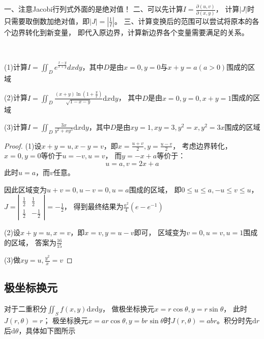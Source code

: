 \begin{note}
  一、注意Jacobi行列式外面的是绝对值！
  二、可以先计算$I = \frac{\partial(u,v)}{\partial (x,y)}$，
  计算$|J|$时只需要取倒数加绝对值，即$|J| = |\frac{1}{I}|$。
  三、计算变换后的范围可以尝试将原本的各个边界转化到新变量，
  即代入原边界，计算新边界各个变量需要满足的关系。
\end{note}

~

\begin{exercise}[一般换元计算题]
  (1)计算$I = \iint _D e^{\frac{x - y}{x + y}}dxdy$，其中$D$是由$x = 0, y = 0$与$x + y = a(a > 0)$围成的区域

  (2)计算$I = \iint_D \frac{(x + y)\ln(1 + \frac{y}{x})}{\sqrt{1 - x- y}}\mathrm{d}x\mathrm{d}y$，
  其中$D$是由$x = 0, y = 0, x+y= 1$围成的区域

  (3)计算$I = \iint_D \frac{3x}{y^2 + xy^3}\mathrm{d}x\mathrm{d}y$，其中$D$是由$xy = 1, xy = 3, y^2 = x, y^2 = 3x$围成的区域
\end{exercise}

\begin{proof}
  (1)设$x + y = u, x - y = v$，即$x = \frac{u + v}{2}, y = \frac{u - v}{2}$，
  考虑边界转化，$x = 0, y = 0$等价于$u = -v, u = v$，
  而$y = -x + a$等价于：
  \begin{equation*}
    u = a, v = 2x + a
  \end{equation*}
  此时$u = a$，而$v$任意。
  
  因此区域变为$u + v = 0, u - v = 0, u = a$围成的区域，
  即$0 \leq u \leq a, -u \leq v \leq u$，
  $J = \left|
    \begin{array}{cc}
      \frac{1}{2}&\frac{1}{2}\\
      \frac{1}{2}& -\frac{1}{2}
    \end{array}
  \right| = - \frac{1}{2}$，
  得到最终结果为$\frac{a^2}{4} (e - e^{-1})$

  (2)设$x+y = u, x = v$，即$x = v, y = u - v$即可，
  区域变为$v = 0, u = v, u = 1$围成的区域，
  答案为$\frac{16}{15}$

  (3)做$xy = u, \frac{y^2}{x} = v$
\end{proof}

\subsection{极坐标换元}

\begin{theorem}[二重积分极坐标换元]
  对于二重积分$\iint_S f(x,y) \mathrm{d}x\mathrm{d}y$，
  做极坐标换元$x = r \cos \theta, y = r \sin \theta$，
  此时$J(r,\theta) = r$；
  极坐标换元$x = ar \cos \theta, y = br \sin \theta$时$J(r,\theta) = abr$。积分时先$\mathrm{d}r$后$\mathrm{d}\theta$，具体如下图所示
\end{theorem}

